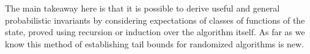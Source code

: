The main takeaway here is that it is possible to derive useful and general probabilistic invariants by considering expectations of classes of functions of the state, proved using recursion or induction over the algorithm itself.
As far as we know this method of establishing tail bounds for randomized algorithms is new.
